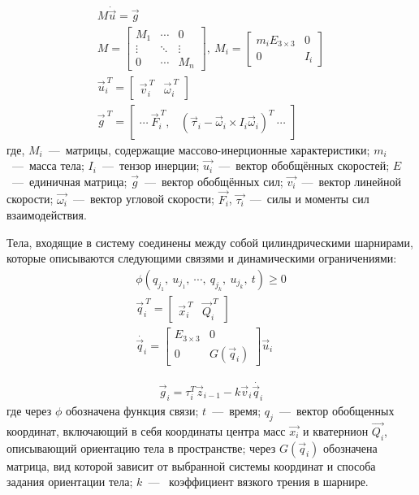 \begin{align}
    \label{eq:newton_euler}
    M \dot{\vec{u}} = \vec{g} \\
    M = \begin{bmatrix}
    M_1 & \cdots  & 0 \\
    \vdots  & \ddots  & \vdots  \\ 
    0 & \cdots   & M_n 
    \end{bmatrix},\ M_i = \begin{bmatrix}
    m_i E_{3\times 3} & 0 \\ 
    0 & I_i 
    \end{bmatrix} \\
    \vec{u}_i^{\ T} = \begin{bmatrix}
        \vec{v}_i^{\ T} & \vec{\omega}_i^{\ T}
    \end{bmatrix} \\ 
    \vec{g}^{\ T} = \begin{bmatrix}
        \cdots \  \vec{F}_i^{\ T}, & (\vec{\tau}_i - \vec{\omega}_i \times I_i \vec{\omega}_i)^T\  \cdots 
    \end{bmatrix}
\end{align}
где, $M_i$~---~матрицы, содержащие массово-инерционные характеристики; $m_i$~---~масса тела; $I_i$~---~тензор инерции; $\vec{u_i}$~---~вектор обобщённых скоростей; $E$~---~единичная матрица; $\vec{g}$~---~вектор обобщённых сил; $\vec{v_i}$~---~вектор линейной скорости; $\vec{\omega_i}$~---~вектор угловой скорости; $\vec{F_i}$, $\vec{\tau_i}$~---~силы и моменты сил взаимодействия.

Тела, входящие в систему соединены между собой цилиндрическими шарнирами, которые описываются следующими связями и динамическими ограничениями:
\begin{align}
    \label{eq:kin_constr}
    \phi(q_{j_1},\ u_{j_1},\ \cdots,\ q_{j_k},\ u_{j_k},\ t) \geqslant  0 \\
    \vec{q}_i^{\ T} = \begin{bmatrix}
        \vec{x}_i^{\ T} & \vec{Q}_i^{\ T}
    \end{bmatrix} \\
    \dot{\vec{q}_i} = \begin{bmatrix}
    E_{3\times3} & 0\\ 
    0 & G(\vec{q}_i) 
    \end{bmatrix}\vec{u}_i  
\end{align}

\begin{align}
    \label{eq:phys_constr}
    \vec{g}_i = \tau_i^T \vec{z}_{i-1} -k\vec{v}_i \dot{\vec{q}_i} 
\end{align}
где через $\phi$ обозначена функция связи; $t$~---~время; $q_{j}$~---~вектор обобщенных координат, включающий в себя координаты центра масс $\vec{x_i}$ и кватернион $\vec{Q_i}$, описывающий ориентацию тела в пространстве; через $G(\vec{q}_i)$ обозначена матрица, вид которой зависит от выбранной системы координат и способа задания ориентации тела; $k$~---~ коэффициент вязкого трения в шарнире.

